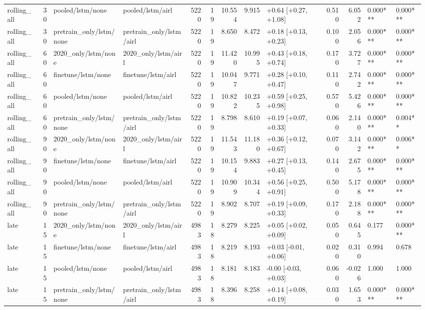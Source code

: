 \begin{tabular}{lrllrrrrlrrll}
rolling_all & 30 & pooled/lstm/none & pooled/lstm/airl & 5220 & 19 & 10.554 & 9.915 & +0.64 [+0.27, +1.08] & 0.510 & 6.052 & 0.000*** & 0.000*** \\
rolling_all & 30 & pretrain_only/lstm/none & pretrain_only/lstm/airl & 5220 & 19 & 8.650 & 8.472 & +0.18 [+0.13, +0.23] & 0.100 & 2.056 & 0.000*** & 0.000*** \\
rolling_all & 60 & 2020_only/lstm/none & 2020_only/lstm/airl & 5220 & 19 & 11.420 & 10.995 & +0.43 [+0.18, +0.74] & 0.170 & 3.727 & 0.000*** & 0.000*** \\
rolling_all & 60 & finetune/lstm/none & finetune/lstm/airl & 5220 & 19 & 10.047 & 9.771 & +0.28 [+0.10, +0.47] & 0.110 & 2.742 & 0.000*** & 0.000*** \\
rolling_all & 60 & pooled/lstm/none & pooled/lstm/airl & 5220 & 19 & 10.822 & 10.235 & +0.59 [+0.25, +0.98] & 0.570 & 5.426 & 0.000*** & 0.000*** \\
rolling_all & 60 & pretrain_only/lstm/none & pretrain_only/lstm/airl & 5220 & 19 & 8.798 & 8.610 & +0.19 [+0.07, +0.33] & 0.060 & 2.140 & 0.000*** & 0.004** \\
rolling_all & 90 & 2020_only/lstm/none & 2020_only/lstm/airl & 5220 & 19 & 11.543 & 11.180 & +0.36 [+0.12, +0.67] & 0.070 & 3.142 & 0.000*** & 0.006** \\
rolling_all & 90 & finetune/lstm/none & finetune/lstm/airl & 5220 & 19 & 10.154 & 9.883 & +0.27 [+0.13, +0.45] & 0.140 & 2.675 & 0.000*** & 0.000*** \\
rolling_all & 90 & pooled/lstm/none & pooled/lstm/airl & 5220 & 19 & 10.909 & 10.344 & +0.56 [+0.25, +0.91] & 0.500 & 5.178 & 0.000*** & 0.000*** \\
rolling_all & 90 & pretrain_only/lstm/none & pretrain_only/lstm/airl & 5220 & 19 & 8.902 & 8.707 & +0.19 [+0.09, +0.33] & 0.170 & 2.188 & 0.000*** & 0.000*** \\
late & 15 & 2020_only/lstm/none & 2020_only/lstm/airl & 4983 & 18 & 8.279 & 8.225 & +0.05 [+0.02, +0.09] & 0.050 & 0.645 & 0.177 & 0.000*** \\
late & 15 & finetune/lstm/none & finetune/lstm/airl & 4983 & 18 & 8.219 & 8.193 & +0.03 [-0.01, +0.06] & 0.020 & 0.310 & 0.994 & 0.678 \\
late & 15 & pooled/lstm/none & pooled/lstm/airl & 4983 & 18 & 8.181 & 8.183 & -0.00 [-0.03, +0.03] & 0.060 & -0.026 & 1.000 & 1.000 \\
late & 15 & pretrain_only/lstm/none & pretrain_only/lstm/airl & 4983 & 18 & 8.396 & 8.258 & +0.14 [+0.08, +0.19] & 0.030 & 1.653 & 0.000*** & 0.000*** \\

\end{tabular}
